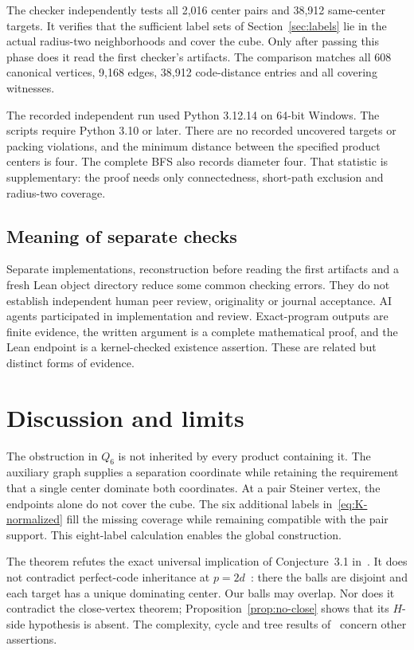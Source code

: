 \documentclass[11pt]{article}
\theoremstyle{definition}
\theoremstyle{remark}
\begin{document}
The checker independently tests all 2,016 center pairs and
38,912 same-center targets. It verifies that the sufficient
label sets of Section~\ref{sec:labels} lie in the actual
radius-two neighborhoods and cover the cube. Only after passing
this phase does it read the first checker's artifacts.
The comparison matches all 608 canonical vertices, 9,168 edges,
38,912 code-distance entries and all covering witnesses.

The recorded independent run used Python 3.12.14 on 64-bit
Windows. The scripts require Python 3.10 or later.
There are no recorded uncovered targets or packing violations,
and the minimum distance between the specified product centers
is four. The complete BFS also records diameter four.
That statistic is supplementary: the proof needs only
connectedness, short-path exclusion and radius-two coverage.

\subsection{Meaning of separate checks}
Separate implementations, reconstruction before reading the
first artifacts and a fresh Lean object directory reduce
some common checking errors. They do not establish independent
human peer review, originality or journal acceptance.
AI agents participated in implementation and review.
Exact-program outputs are finite evidence, the written
argument is a complete mathematical proof, and the Lean
endpoint is a kernel-checked existence assertion.
These are related but distinct forms of evidence.

\section{Discussion and limits}\label{sec:discussion}
The obstruction in \(Q_6\) is not inherited by every product
containing it. The auxiliary graph supplies a separation
coordinate while retaining the requirement that a single
center dominate both coordinates. At a pair Steiner vertex,
the endpoints alone do not cover the cube. The six additional
labels in~\eqref{eq:K-normalized} fill the missing coverage while
remaining compatible with the pair support.
This eight-label calculation enables the global construction.

The theorem refutes the exact universal implication of
Conjecture~3.1 in~\cite{bickz-strong}. It does not contradict
perfect-code inheritance at \(p=2d\)~\cite{perfect}: there the
balls are disjoint and each target has a unique dominating
center. Our balls may overlap. Nor does it contradict the
close-vertex theorem; Proposition~\ref{prop:no-close} shows
that its \(H\)-side hypothesis is absent.
The complexity, cycle and tree results
of~\cite{bickz-complexity} concern other assertions.
\end{document}
